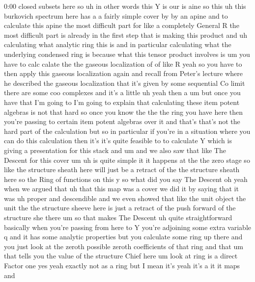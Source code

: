 \begin{unfinished}{0:00}
closed  subsets
here  so  uh  in  other  words  this  Y  is  our
is
aine
so  this  uh  this  burkovich  spectrum  here
has  a  a  fairly  simple  cover
by  by  an  apine  and  to  calculate  this
apine  the  most  difficult  part  for  like  a
completely  General  R  the  most  difficult
part  is  already  in  the  first  step  that
is  making  this  product  and  uh
calculating  what  analytic  ring  this  is
and  in  particular  calculating  what  the
underlying  condensed  ring  is  because
what  this  tensor  product  involves  is  um
you  have  to  calc  calate  the  the  gaseous
localization  of  of  like  R
yeah
so  you  have  to  then  apply  this  gaseous
localization  again  and  recall  from
Peter's  lecture  where  he  described  the
gaseous  localization  that  it's  given  by
some  sequential  Co  limit  there  are  some
coo  complexes  and  it's  a  little  uh  yeah
then
a  um  but  once  you  have  that  I'm  going  to
I'm  going  to  explain  that  calculating
these  item  potent  algebras  is  not  that
hard  so  once  you  know  the  the  the  ring
you  have  here  then  you're  passing  to
certain  item  potent  algebras  over  it  and
that's  that's  not  the  hard  part  of  the
calculation  but  so  in  particular  if
you're  in  a  situation  where  you  can  do
this  calculation  then  it's  it's  quite
feasible  to  to  calculate  Y  which  is
giving  a  presentation  for  this  stack  and
um  and  we  also  saw  that  like  The  Descent
for  this  cover  um  uh  is  quite  simple  it
it  happens  at  the  the  zero  stage  so  like
the  structure  sheath  here  will  just  be  a
retract  of  the  the  structure  sheath  here
so  the  Ring  of  functions  on  this  y  so
what  did  you  say
The
Descent  oh  yeah  when  we  argued  that  uh
that  this  map  was  a
cover  we  did  it  by  saying  that  it  was  uh
proper  and
descendible  and  we  even  showed  that  like
the  unit  object  the  unit  the  the
structure  sheeve  here  is  just  a  retract
of  the  push  forward  of  the  structure  she
there  um  so  that  makes  The  Descent  uh
quite  straightforward  basically
when  you're  passing  from  here  to  Y
you're  adjoining  some  extra  variable  q
and  it  has  some  analytic  properties  but
you  calculate  some  ring  up  there  and  you
just  look  at  the  zeroth  possible  zeroth
coefficients  of  that  ring  and  that  um
that  tells  you  the  value  of  the
structure  Chief  here
um  look  at  ring  is  a  direct  Factor  one
yes  yeah  exactly  not  as  a  ring  but  I
mean  it's  yeah  it's  a  it  it  maps  and

\end{unfinished}
